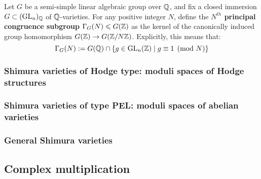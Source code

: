             \begin{definition} \label{def: principal_congruence_subgroups}
                Let $G$ be a semi-simple linear algebraic group over $\mathbb{Q}$, and fix a closed immersion $G \subset (\operatorname{GL}_n)_{\mathbb{Q}}$ of $\mathbb{Q}$-varieties. For any positive integer $N$, define the \textbf{$N^{th}$ principal congruence subgroup} $\Gamma_G(N) \leqslant G(\mathbb{Z})$ as the kernel of the canonically induced group homomorphism $G(\mathbb{Z}) \to G(\mathbb{Z}/N\mathbb{Z})$. Explicitly, this means that:
                    $$\Gamma_G(N) := G(\mathbb{Q}) \cap \{g \in \operatorname{GL}_n(\mathbb{Z}) \mid g \equiv 1 \pmod{N}\}$$
            \end{definition}
    
        \subsubsection{Shimura varieties of Hodge type: moduli spaces of Hodge structures}
        
        \subsubsection{Shimura varieties of type PEL: moduli spaces of abelian varieties}
        
        \subsubsection{General Shimura varieties}
        
    \subsection{Complex multiplication}